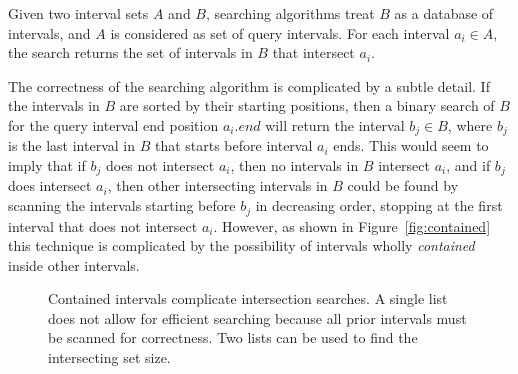 \documentclass{bioinfo}
\begin{document}
	Given two interval sets $A$ and $B$, searching algorithms treat $B$ as a database of intervals, and
	$A$ is considered as set of query intervals.  For each interval $a_i \in A$, the
	search returns the set of intervals in $B$ that intersect $a_i$.

	The correctness of the searching algorithm is complicated by a subtle detail.
	If the intervals in $B$ are sorted by their starting positions, then a binary
	search of $B$ for the query interval end position $a_i.end$ will return the
	interval $b_j \in B$, where $b_j$ is the last interval in $B$ that starts before
	interval $a_i$ ends.  This would seem to imply that if $b_j$ does not intersect
	$a_i$, then no intervals in $B$ intersect $a_i$, and if $b_j$ does intersect
	$a_i$, then other intersecting intervals in $B$ could be found by scanning the
	intervals starting before $b_j$ in decreasing order, stopping at the first
	interval that does not intersect $a_i$.  However, as shown in Figure~\ref{fig:contained} 
	this technique is complicated by the possibility of intervals wholly {\em contained} 
	inside other intervals.
	
	\begin{figure}[h]
		\centering
		\caption{Contained intervals complicate intersection searches.
		A single list  does not allow for
		efficient searching because all prior intervals must be scanned for
		correctness. Two lists  can be used to
		find the intersecting set size.}
		\label{bitssearching}
	\end{figure}
	
\end{document}
